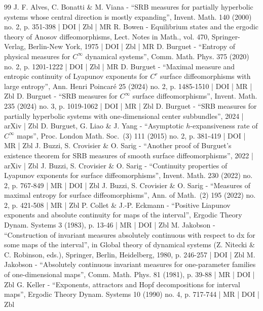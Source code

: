 \documentclass[10pt]{amsart}
\theoremstyle{definition}
\begin{document}
\begin{thebibliography}{99}
J. F. Alves, C. Bonatti \& M. Viana - “SRB measures for partially hyperbolic systems whose central direction is mostly expanding”, Invent. Math. 140 (2000) no. 2, p. 351-398 | DOI | Zbl | MR
R. Bowen - Equilibrium states and the ergodic theory of Anosov diffeomorphisms, Lect. Notes in Math., vol. 470, Springer-Verlag, Berlin-New York, 1975 | DOI | Zbl | MR
D. Burguet - “Entropy of physical measures for $C^\infty $ dynamical systems”, Comm. Math. Phys. 375 (2020) no. 2, p. 1201-1222 | DOI | Zbl | MR
D. Burguet - “Maximal measure and entropic continuity of Lyapunov exponents for $C^r$ surface diffeomorphisms with large entropy”, Ann. Henri Poincaré 25 (2024) no. 2, p. 1485-1510 | DOI | MR | Zbl
D. Burguet - “SRB measures for $C^\infty $ surface diffeomorphisms”, Invent. Math. 235 (2024) no. 3, p. 1019-1062 | DOI | MR | Zbl
D. Burguet - “SRB measures for partially hyperbolic systems with one-dimensional center subbundles”, 2024 | arXiv | Zbl
D. Burguet, G. Liao \& J. Yang - “Asymptotic $h$-expansiveness rate of $C^\infty $ maps”, Proc. London Math. Soc. (3) 111 (2015) no. 2, p. 381-419 | DOI | MR | Zbl
J. Buzzi, S. Crovisier \& O. Sarig - “Another proof of Burguet’s existence theorem for SRB measures of smooth surface diffeomorphisms”, 2022 | arXiv | Zbl
J. Buzzi, S. Crovisier \& O. Sarig - “Continuity properties of Lyapunov exponents for surface diffeomorphisms”, Invent. Math. 230 (2022) no. 2, p. 767-849 | MR | DOI | Zbl
J. Buzzi, S. Crovisier \& O. Sarig - “Measures of maximal entropy for surface diffeomorphisms”, Ann. of Math. (2) 195 (2022) no. 2, p. 421-508 | MR | Zbl
P. Collet \& J.-P. Eckmann - “Positive Liapunov exponents and absolute continuity for maps of the interval”, Ergodic Theory Dynam. Systems 3 (1983), p. 13-46 | MR | DOI | Zbl
M. Jakobson - “Construction of invariant measures absolutely continuous with respect to dx for some maps of the interval”, in Global theory of dynamical systems (Z. Nitecki \& C. Robinson, eds.), Springer, Berlin, Heidelberg, 1980, p. 246-257 | DOI | Zbl
M. Jakobson - “Absolutely continuous invariant measures for one-parameter families of one-dimensional maps”, Comm. Math. Phys. 81 (1981), p. 39-88 | MR | DOI | Zbl
G. Keller - “Exponents, attractors and Hopf decompositions for interval maps”, Ergodic Theory Dynam. Systems 10 (1990) no. 4, p. 717-744 | MR | DOI | Zbl

\end{thebibliography}
\end{document}
